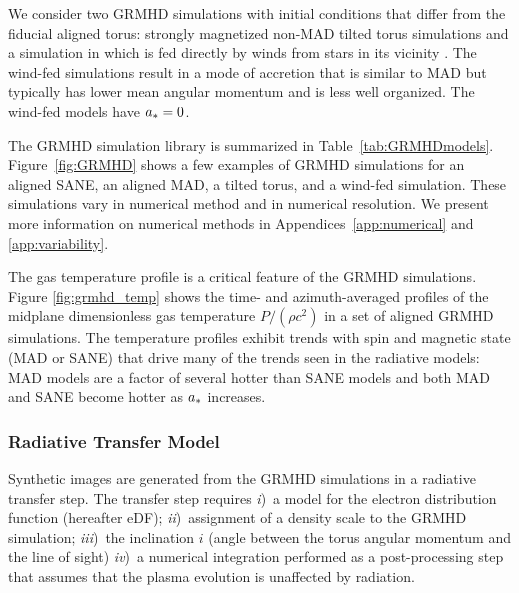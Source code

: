 We consider two GRMHD simulations with initial conditions that differ from the fiducial aligned torus: strongly magnetized non-MAD tilted torus simulations \citep{Liska2018, Chatterjee2020} and a simulation in which \sgra is fed directly by winds from stars in its vicinity \citep{2020ApJ...896L...6R}.
The wind-fed simulations result in a mode of accretion that is similar to MAD but typically has lower mean angular momentum and is less well organized.
The wind-fed models have $a_* = 0$.

The GRMHD simulation library is summarized in Table~\ref{tab:GRMHDmodels}.
Figure~\ref{fig:GRMHD} shows a few examples of GRMHD simulations for an aligned SANE, an aligned MAD, a tilted torus, and a wind-fed simulation.
These simulations vary in numerical method and in numerical resolution.
We present more information on numerical methods in Appendices~\ref{app:numerical} and \ref{app:variability}.

The gas temperature profile is a critical feature of the GRMHD simulations.
Figure \ref{fig:grmhd_temp} shows the time- and azimuth-averaged profiles of the midplane dimensionless gas temperature $P/(\rho c^2)$ in a set of aligned GRMHD simulations.
The temperature profiles exhibit trends with spin and magnetic state (MAD or SANE) that drive many of the trends seen in the radiative models: MAD models are a factor of several hotter than SANE models and both MAD and SANE become hotter as $a_*$ increases.

\subsubsection{Radiative Transfer Model}

Synthetic images are generated from the GRMHD simulations in a radiative transfer step.  The transfer step requires
\emph{i})~a model for the electron distribution function (hereafter eDF);
\emph{ii})~assignment of a density scale to the GRMHD simulation;
\emph{iii})~the inclination $i$ (angle between the torus angular momentum and the line of sight)
\emph{iv})~a numerical integration performed as a post-processing step that assumes that the plasma evolution is unaffected by radiation.


